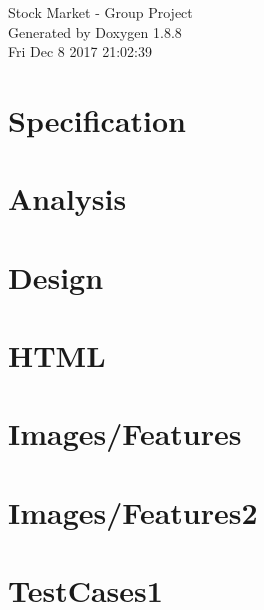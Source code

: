 \documentclass[twoside]{article}
\newcommand{\+}{\discretionary{\mbox{\scriptsize$\hookleftarrow$}}{}{}}
\begin{document}
\hypersetup{pageanchor=false,
             bookmarks=true,
             bookmarksnumbered=true,
             pdfencoding=unicode
            }
\begin{titlepage}
\vspace*{7cm}
\begin{center}%
{\Large Stock Market -\/ Group Project }\\
\vspace*{1cm}
{\large Generated by Doxygen 1.8.8}\\
\vspace*{0.5cm}
{\small Fri Dec 8 2017 21:02:39}\\
\end{center}
\end{titlepage}
\tableofcontents
{}
\hypersetup{pageanchor=true}

\section{Specification}
\label{Specification}
\hypertarget{Specification}{}

\section{Analysis}
\label{Analysis}
\hypertarget{Analysis}{}

\section{Design}
\label{Design}
\hypertarget{Design}{}

\section{H\+T\+M\+L}
\label{HTML}
\hypertarget{HTML}{}

\section{Images/\+Features}
\label{Images_2Features}
\hypertarget{Images_2Features}{}

\section{Images/\+Features2}
\label{Images_2Features2}
\hypertarget{Images_2Features2}{}

\section{Test\+Cases1}
\label{TestCases1}
\hypertarget{TestCases1}{}

\end{document}
